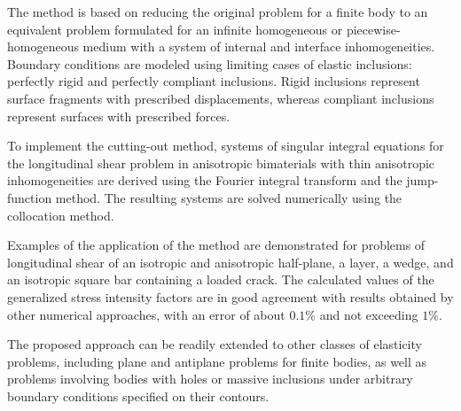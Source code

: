 The method is based on reducing the original problem for a finite body to
an equivalent problem formulated for an infinite homogeneous or
piecewise-homogeneous medium with a system of internal and interface
inhomogeneities. Boundary conditions are modeled using limiting cases of
elastic inclusions: perfectly rigid and perfectly compliant inclusions.
Rigid inclusions represent surface fragments with prescribed
displacements, whereas compliant inclusions represent surfaces with
prescribed forces.

To implement the cutting-out method, systems of singular integral
equations for the longitudinal shear problem in anisotropic bimaterials
with thin anisotropic inhomogeneities are derived using the Fourier
integral transform and the jump-function method. The resulting systems
are solved numerically using the collocation method.

Examples of the application of the method are demonstrated for problems
of longitudinal shear of an isotropic and anisotropic half-plane, a
layer, a wedge, and an isotropic square bar containing a loaded crack.
The calculated values of the generalized stress intensity factors are in
good agreement with results obtained by other numerical approaches, with
an error of about $0.1\%$ and not exceeding $1\%$.

The proposed approach can be readily extended to other classes of
elasticity problems, including plane and antiplane problems for finite
bodies, as well as problems involving bodies with holes or massive
inclusions under arbitrary boundary conditions specified on their
contours.

 